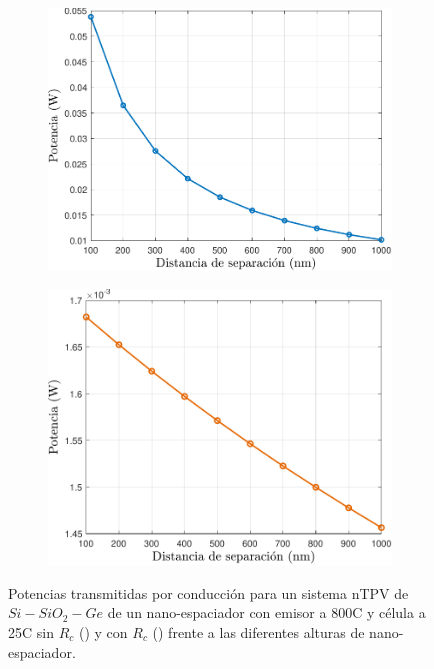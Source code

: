 \begin{figure}[H]
	\centering
	\begin{subfigure}[b]{0.49\textwidth}
		\centering
		\includegraphics[width=1\textwidth]{Pn_SiSiO2Ge.pdf}
		\caption{ }
		\label{fig:Pn_SiSiO2Ge}
	\end{subfigure}
	\hfill
	\begin{subfigure}[b]{0.49\textwidth}
		\centering
		\includegraphics[width=1.00\textwidth]{Prc2_SiSiO2Ge.pdf}
		\caption{ }
		\label{fig:Prc_SiSiO2Ge}
	\end{subfigure}
	\caption{Potencias transmitidas por conducción para un sistema nTPV de $Si-SiO_2-Ge$ de un nano-espaciador con emisor a 800\textdegree C y célula a 25\textdegree C sin $R_c$ () y con $R_c$ () frente a las diferentes alturas de nano-espaciador.}
	\label{fig:Pcond_SiSiO2Ge}
\end{figure}
